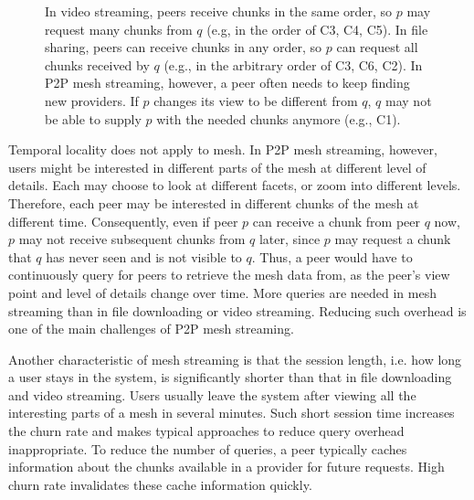     \begin{figure}
    \centering
    \caption{
    In video streaming, peers receive chunks in the same order, so $p$
    may request many chunks from $q$ (e.g, in the order of C3, C4, C5).
	 In file sharing, peers can receive
    chunks in any order, so $p$ can request all chunks received by $q$
	(e.g., in the arbitrary order of C3, C6, C2). In
    P2P mesh streaming, however, a peer often needs to keep finding
    new providers.  If $p$ changes its view to be different from $q$,
	$q$ may not be able to supply $p$ with the needed chunks anymore 
	(e.g., C1). \label{f:diff}}
    \end{figure}

    Temporal locality does not apply to mesh.  In P2P mesh
    streaming, however, users might be interested in
    different parts of the mesh at different level of
    details.  Each may choose to look at different facets,
    or zoom into different levels.  Therefore, each peer may
    be interested in different chunks of the mesh at
    different time.  Consequently, even if peer $p$ can
    receive a chunk from peer $q$ now, $p$ may not receive
    subsequent chunks from $q$ later, since $p$ may request
    a chunk that $q$ has never seen and is not visible to
    $q$. %
    Thus, a peer would have
    to continuously query for peers to retrieve the mesh
    data from, as the peer's view point and level of details
    change over time.  More queries are needed in mesh
    streaming than in file downloading or video streaming.
    Reducing such overhead is one of the main challenges of
    P2P mesh streaming.

    Another characteristic of mesh streaming is that the
    session length, i.e. how long a user stays in the
    system, is significantly shorter than that in file
    downloading and video streaming.  Users usually leave
    the system after viewing all the interesting parts of a
    mesh in several minutes.  Such short session time
    increases the churn rate and makes typical approaches to
    reduce query overhead inappropriate. To reduce the
    number of queries, a peer typically caches information
    about the chunks available in a provider for future
    requests.  High churn rate invalidates these cache
    information quickly.

